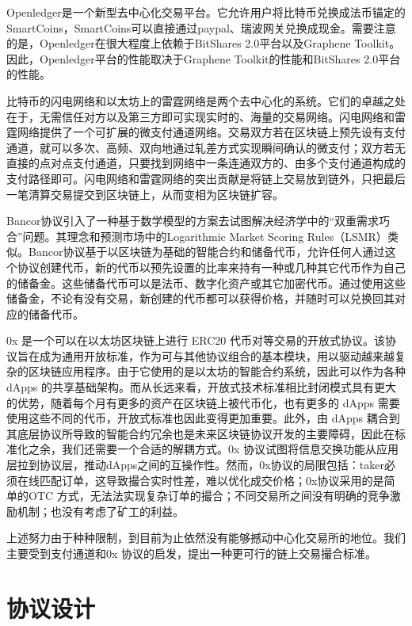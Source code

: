 \documentclass[UTF8,nofonts]{ctexart}
\begin{document}
Openledger\cite{openledger}是一个新型去中心化交易平台。它允许用户将比特币兑换成法币锚定的SmartCoins，SmartCoins可以直接通过paypal、瑞波网关兑换成现金。需要注意的是，Openledger在很大程度上依赖于BitShares 2.0平台以及Graphene Toolkit。因此，Openledger平台的性能取决于Graphene Toolkit的性能和BitShares 2.0平台的性能。

比特币的闪电网络\cite{poon2015bitcoin}和以太坊上的雷霆网络\cite{raidennetwork}是两个去中心化的系统。它们的卓越之处在于，无需信任对方以及第三方即可实现实时的、海量的交易网络。闪电网络和雷霆网络提供了一个可扩展的微支付通道网络。交易双方若在区块链上预先设有支付通道，就可以多次、高频、双向地通过轧差方式实现瞬间确认的微支付；双方若无直接的点对点支付通道，只要找到网络中一条连通双方的、由多个支付通道构成的支付路径即可。闪电网络和雷霆网络的突出贡献是将链上交易放到链外，只把最后一笔清算交易提交到区块链上，从而变相为区块链扩容。

Bancor\cite{bancor}协议引入了一种基于数学模型的方案去试图解决经济学中的“双重需求巧合”问题。其理念和预测市场中的Logarithmic Market Scoring Rules（LSMR）\cite{hanson2012logarithmic}类似。Bancor协议基于以区块链为基础的智能合约和储备代币，允许任何人通过这个协议创建代币，新的代币以预先设置的比率来持有一种或几种其它代币作为自己的储备金。这些储备代币可以是法币、数字化资产或其它加密代币。通过使用这些储备金，不论有没有交易，新创建的代币都可以获得价格，并随时可以兑换回其对应的储备代币。

0x \cite{warren20170x} 是一个可以在以太坊区块链上进行 ERC20\cite{ERC20} 代币对等交易的开放式协议。该协议旨在成为通用开放标准，作为可与其他协议组合的基本模块，用以驱动越来越复杂的区块链应用程序。由于它使用的是以太坊的智能合约系统，因此可以作为各种 dApps 的共享基础架构。而从长远来看，开放式技术标准相比封闭模式具有更大的优势，随着每个月有更多的资产在区块链上被代币化，也有更多的 dApps 需要使用这些不同的代币，开放式标准也因此变得更加重要。此外，由 dApps 耦合到其底层协议所导致的智能合约冗余也是未来区块链协议开发的主要障碍，因此在标准化之余，我们还需要一个合适的解耦方式。0x 协议试图将信息交换功能从应用层拉到协议层，推动dApps之间的互操作性。然而，0x协议的局限包括：taker必须在线匹配订单，这导致撮合实时性差，难以优化成交价格；0x协议采用的是简单的OTC 方式，无法法实现复杂订单的撮合；不同交易所之间没有明确的竞争激励机制；也没有考虑了矿工的利益。

上述努力由于种种限制，到目前为止依然没有能够撼动中心化交易所的地位。我们主要受到支付通道和0x 协议的启发，提出一种更可行的链上交易撮合标准。


\section{协议设计\label{sec:protocol}}
\end{document}
